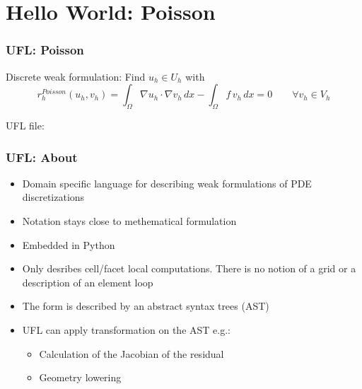 \documentclass[aspectratio=169,11pt]{beamer}
\theoremstyle{definition}
\begin{document}
\section{Hello World: Poisson}

\begin{frame}
  \frametitle{UFL: Poisson}
  Discrete weak formulation: Find $u_h \in U_h$ with
  \begin{equation*}
    r_h^{Poisson}(u_h, v_h) = \int_\Omega \nabla u_h \cdot \nabla v_h \, dx
    - \int_\Omega f \, v_h \, dx = 0 \qquad \forall v_h \in V_h
  \end{equation*}

  UFL file:
  
\end{frame}

\begin{frame}
  \frametitle{UFL: About}
  \begin{itemize}
  \item Domain specific language for describing weak formulations of PDE
    discretizations
  \item Notation stays close to methematical formulation
  \item Embedded in Python
  \item Only desribes cell/facet local computations. There is no notion of a
    grid or a description of an element loop
  \item The form is described by an abstract syntax trees (AST)
  \item UFL can apply transformation on the AST e.g.:
    \begin{itemize}
    \item Calculation of the Jacobian of the residual
    \item Geometry lowering
    \end{itemize}
  \end{itemize}
\end{frame}
\end{document}
